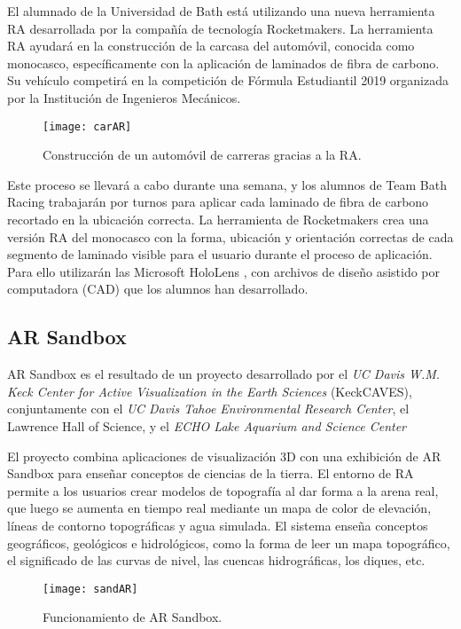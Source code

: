 El alumnado de la Universidad de Bath está utilizando una nueva herramienta RA desarrollada por la compañía de tecnología Rocketmakers. 
La herramienta RA ayudará en la construcción de la carcasa del automóvil, conocida como monocasco, específicamente con la aplicación de laminados de fibra de carbono. 
Su vehículo competirá en la competición de Fórmula Estudiantil 2019 organizada por la Institución de Ingenieros Mecánicos.

\begin{figure}[h]
    \centering
    \texttt{[image: carAR]}
    \caption{Construcción de un automóvil de carreras gracias a la RA.}
    \label{fig:xyz}
\end{figure}    

Este proceso se llevará a cabo durante una semana, y los alumnos de Team Bath Racing trabajarán por turnos para aplicar cada laminado de fibra de carbono recortado en la ubicación correcta. La herramienta de Rocketmakers crea una versión RA del monocasco con la forma, ubicación y orientación correctas de cada segmento de laminado visible para el usuario durante el proceso de aplicación. Para ello utilizarán las Microsoft HoloLens \cite{URL::hololens}, con archivos de diseño asistido por computadora (CAD) que los alumnos han desarrollado.

 

\subsection{AR Sandbox} 
AR Sandbox \cite{URL::sandbox} es el resultado de un proyecto desarrollado por 
el \textit{UC Davis W.M. Keck Center for Active Visualization in the Earth Sciences} (KeckCAVES), 
conjuntamente con el \textit{UC Davis Tahoe Environmental Research Center}, el Lawrence Hall of Science, y el \textit{ECHO Lake Aquarium and Science Center}

El proyecto combina aplicaciones de visualización 3D con una exhibición de AR Sandbox para enseñar conceptos de ciencias de la tierra. 
El entorno de RA permite a los usuarios crear modelos de topografía al dar forma a la arena real, que luego se aumenta en tiempo real mediante un mapa de color de elevación, líneas de contorno topográficas y agua simulada. 
El sistema enseña conceptos geográficos, geológicos e hidrológicos, como la forma de leer un mapa topográfico, el significado de las curvas de nivel, las cuencas hidrográficas, los diques, etc.

\begin{figure}[h]
    \centering
    \texttt{[image: sandAR]}
    \caption{Funcionamiento de AR Sandbox.}
    \label{fig:xyz}
\end{figure}    







